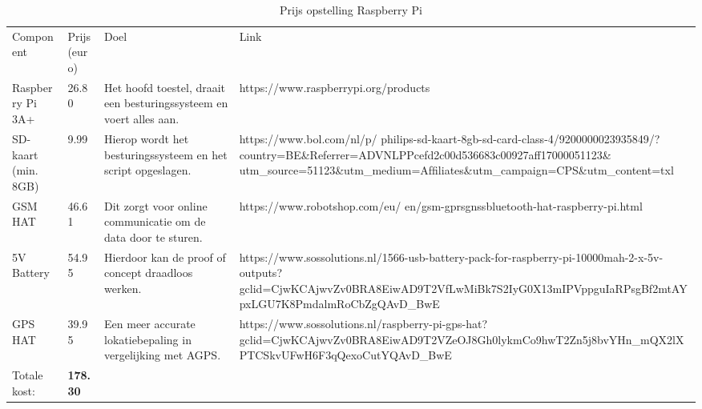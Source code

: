\begin{table}[]
	\begin{tabular}{llll}
		Component           & Prijs (euro) & Doel                                                                & Link                                                                                                                                                                                                                             \\
		Raspberry Pi 3A+    & 26.80        & Het hoofd toestel, draait een besturingssysteem en voert alles aan. & https://www.raspberrypi.org/products                                                                                                                                                                                             \\
		SD-kaart (min. 8GB) & 9.99         & Hierop wordt het besturingssysteem en het script opgeslagen.        & https://www.bol.com/nl/p/ philips-sd-kaart-8gb-sd-card-class-4/9200000023935849/?country=BE\&Referrer=ADVNLPPcefd2c00d536683c00927aff17000051123\& utm\_source=51123\&utm\_medium=Afﬁliates\&utm\_campaign=CPS\&utm\_content=txl \\
		GSM HAT             & 46.61        & Dit zorgt voor online communicatie om de data door te sturen.       & https://www.robotshop.com/eu/ en/gsm-gprsgnssbluetooth-hat-raspberry-pi.html                                                                                                                                                     \\
		5V Battery          & 54.95        & Hierdoor kan de proof of concept draadloos werken.                  & https://www.sossolutions.nl/1566-usb-battery-pack-for-raspberry-pi-10000mah-2-x-5v-outputs?gclid=CjwKCAjwvZv0BRA8EiwAD9T2VfLwMiBk7S2IyG0X13mIPVppguIaRPsgBf2mtAYpxLGU7K8PmdalmRoCbZgQAvD\_BwE                                    \\
		GPS HAT             & 39.95        & Een meer accurate lokatiebepaling in vergelijking met AGPS.         & https://www.sossolutions.nl/raspberry-pi-gps-hat?gclid=CjwKCAjwvZv0BRA8EiwAD9T2VZeOJ8Gh0lykmCo9hwT2Zn5j8bvYHn\_mQX2lXPTCSkvUFwH6F3qQexoCutYQAvD\_BwE                                                                             \\
		Totale kost:        & \textbf{178.30}        &                                                                     &                                                                                                                                                                                                                                 
	\end{tabular}
\caption{Prijs opstelling Raspberry Pi}
\label{tab:rpi}
\end{table}

